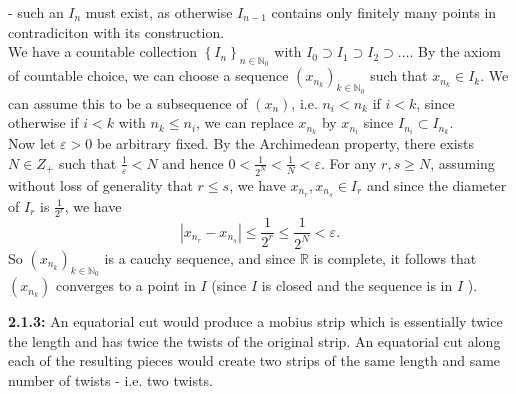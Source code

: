 \documentclass[a4paper]{article}
\begin{document}
    - such an $I_n$ must exist, as otherwise
    $I_{n-1}$ contains only finitely many points in contradiciton with
    its construction.\\
    We have a countable collection
    $\left\{ I_n \right\}_{n \in \mathbb{N}_{0}}$ with
    $I_0 \supset I_1 \supset I_2 \supset \ldots$.
    By the axiom of countable choice, we can choose a
    sequence $\left( x_{n_{k}} \right)_{k \in \mathbb{N}_{0}}$ such that
    $x_{n_k} \in I_{k}$. We can assume this to be
    a subsequence of $(x_n)$, i.e. $n_i < n_k$ if $i < k$, since
    otherwise if $i < k$ with $n_k \le n_i$, we can replace $x_{n_k}$ by $x_{n_i}$ since
    $I_{n_i} \subset I_{n_k}$.\\
    \linebreak
    Now let $\varepsilon > 0$ be arbitrary fixed. By the Archimedean property,
    there exists $N \in Z_{+}$ such that $\frac{1}{\varepsilon} < N$ and hence
    $0 < \frac{1}{2^{N}} < \frac{1}{N} < \varepsilon$.
    For any $r,s \ge N$, assuming without loss of generality that $r \le s$,
    we have $x_{n_{r}}, x_{n_{s}} \in I_{r}$ and since the diameter
    of $I_r$ is $\frac{1}{2^{r}}$, we have
    \[
    |x_{n_r} - x_{n_s}| \le \frac{1}{2^{r}} \le \frac{1}{2^{N}} < \varepsilon.
    \] 
    So $\left( x_{n_k} \right)_{k \in \mathbb{N}_{0}}$ is a cauchy sequence,
    and
    since $\mathbb{R}$ is complete, it follows that 
    $\left( x_{n_k} \right) $ converges to a point in $I$ (since $I$ is closed
    and the sequence is in $I$ ).\\
    \linebreak
    
    
    \textbf{2.1.3:} An equatorial cut would produce a mobius strip which is
    essentially twice the length and has twice the twists of the original
    strip. An equatorial cut along each of the resulting pieces would create
    two strips of the same length and same number of twists - i.e. two twists.
    
    
    
    
   

   
   
   
\end{document}
